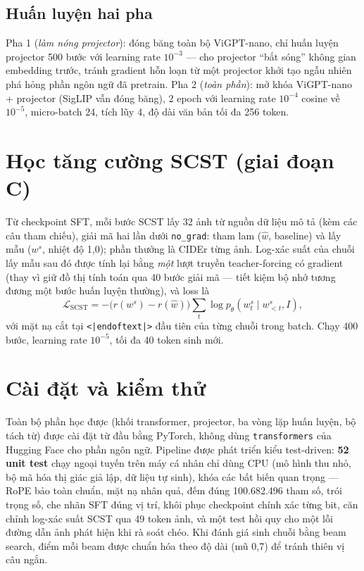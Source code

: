 \subsection{Huấn luyện hai pha}

Pha 1 (\emph{làm nóng projector}): đóng băng toàn bộ ViGPT-nano, chỉ huấn
luyện projector 500 bước với learning rate $10^{-3}$ --- cho projector ``bắt
sóng'' không gian embedding trước, tránh gradient hỗn loạn từ một projector
khởi tạo ngẫu nhiên phá hỏng phần ngôn ngữ đã pretrain. Pha 2 (\emph{toàn
phần}): mở khóa ViGPT-nano + projector (SigLIP vẫn đóng băng), 2 epoch với
learning rate $10^{-4}$ cosine về $10^{-5}$, micro-batch 24, tích lũy 4,
độ dài văn bản tối đa 256 token.

\section{Học tăng cường SCST (giai đoạn C)}
\label{sec:met-scst}

Từ checkpoint SFT, mỗi bước SCST lấy 32 ảnh từ nguồn dữ liệu mô tả (kèm các
câu tham chiếu), giải mã hai lần dưới \texttt{no\_grad}: tham lam
($\hat{w}$, baseline) và lấy mẫu ($w^s$, nhiệt độ 1,0); phần thưởng là CIDEr
từng ảnh. Log-xác suất của chuỗi lấy mẫu sau đó được tính lại bằng \emph{một}
lượt truyền teacher-forcing có gradient (thay vì giữ đồ thị tính toán qua 40
bước giải mã --- tiết kiệm bộ nhớ tương đương một bước huấn luyện thường), và
loss là
\begin{equation}
	\mathcal{L}_{\mathrm{SCST}} = -\bigl(r(w^s) - r(\hat{w})\bigr) \sum_{t} \log p_\theta(w^s_t \mid w^s_{<t}, I),
	\label{eq:scst-loss}
\end{equation}
với mặt nạ cắt tại \texttt{<|endoftext|>} đầu tiên của từng chuỗi trong
batch. Chạy 400 bước, learning rate $10^{-5}$, tối đa 40 token sinh mới.

\section{Cài đặt và kiểm thử}
\label{sec:met-infra}

Toàn bộ phần học được (khối transformer, projector, ba vòng lặp huấn luyện,
bộ tách từ) được cài đặt từ đầu bằng PyTorch, không dùng \texttt{transformers}
của Hugging Face cho phần ngôn ngữ. Pipeline được phát triển kiểu test-driven:
\textbf{52 unit test} chạy ngoại tuyến trên máy cá nhân chỉ dùng CPU (mô hình
thu nhỏ, bộ mã hóa thị giác giả lập, dữ liệu tự sinh), khóa các bất biến quan
trọng --- RoPE bảo toàn chuẩn, mặt nạ nhân quả, đếm đúng 100.682.496 tham số,
trói trọng số, che nhãn SFT đúng vị trí, khôi phục checkpoint chính xác từng
bit, căn chỉnh log-xác suất SCST qua 49 token ảnh, và một test hồi quy cho một
lỗi đường dẫn ảnh phát hiện khi rà soát chéo. Khi đánh giá sinh chuỗi bằng
beam search, điểm mỗi beam được chuẩn hóa theo độ dài (mũ 0,7) để tránh thiên
vị câu ngắn.
